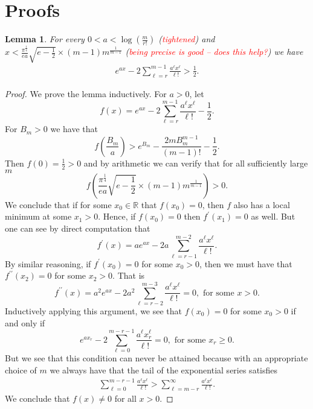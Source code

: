 \documentclass[12pt]{amsart}
\newtheorem{lemma}[theorem]{Lemma}
\theoremstyle{definition}
\theoremstyle{remark}
\numberwithin{equation}{section}
\begin{document}
\section{Proofs}

\begin{lemma}\label{calc}
For every $0<a<\log\left(\frac{m}{r!}\right)$ (\textcolor{red}{tightened}) and 
$x<\frac{\pi^{\frac{1}{4}}}{ea}\sqrt{e-\frac{1}{2}} \times (m-1) m^{\frac{1}{m-1}}$ 
(\textcolor{red}{being precise is good -- does this help?}) we have 
\begin{align*}
e^{ax} -2\sum_{\ell=r}^{m-1} \frac{a^{\ell}x^{\ell}}{\ell!} > \frac{1}{2}. 
\end{align*}
\end{lemma}
\begin{proof}
We prove the lemma inductively. 
For $a> 0$, let 
$$f(x) = e^{ax} -2\sum_{\ell=r}^{m-1} \frac{a^{\ell}x^{\ell}}{\ell!} - \frac{1}{2}.$$
For $B_m > 0$ we have that 
\[
f\left(\frac{B_m}{a}\right) > e^{B_m} - \frac{2m B_m^{m-1}}{(m-1)!} - \frac{1}{2}. 
\]
Then $f(0) = \frac{1}{2} >0$ and by arithmetic we can verify that for all sufficiently large $m$ 
$$f\left(\frac{\pi^{\frac{1}{4}}}{ea}\sqrt{e-\frac{1}{2}} \times (m-1) m^{\frac{1}{m-1}}\right) > 0.$$ 
We conclude that if for some $x_0 \in \mathbb{R}$ that $f(x_0) = 0$, then $f$ also has a local minimum at some $x_1>0$. 
Hence, if $f(x_0) =0$ then $f^{\prime}(x_1) = 0$ as well. But one can see by direct computation that 
$$f^{\prime}(x) = a e^{ax} - 2a\sum_{\ell=r-1}^{m-2} \frac{a^{\ell}x^{\ell}}{\ell!}.$$
By similar reasoning, if $f^{\prime}(x_0) = 0$ for some $x_0 > 0$, 
then we must have that $f^{\prime\prime}(x_2) = 0$ for some $x_2>0$. That is
$$f^{\prime\prime}(x) = a^2 e^{ax} - 2a^2\sum_{\ell=r-2}^{m-3} \frac{a^{\ell}x^{\ell}}{\ell!} = 0, \text{ for some }x>0.$$
Inductively applying this argument, we see that $f(x_0) = 0$ for some $x_0 > 0$ if and only if
$$e^{ax_{r}} - 2\sum_{\ell=0}^{m-r-1} \frac{a^{\ell}x_r^{\ell}}{\ell!} = 0, \text{ for some } x_r \geq 0.$$
But we see that this condition can never be attained because 
with an appropriate choice of $m$ we always have that the tail of the exponential series satisfies
\begin{align*}
\sum_{\ell =0}^{m-r-1} \frac{a^{\ell}x^{\ell}}{\ell!}> 
     \sum_{\ell=m-r}^{\infty} \frac{a^{\ell}x^{\ell}}{\ell!}. 
\end{align*}
We conclude that $f(x) \neq 0$ for all $x > 0$. 
\end{proof}
 
\end{document}

